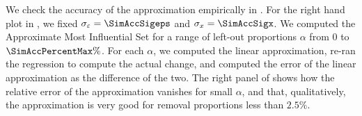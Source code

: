 We check the accuracy of the approximation empirically in
. For the right hand plot in ,
we fixed $\sigma_\varepsilon = \SimAccSigeps$ and $\sigma_x = \SimAccSigx$. We
computed the Approximate Most Influential Set for a range of left-out
proportions $\alpha$ from $0$ to $\SimAccPercentMax \%$.  For each $\alpha$, we
computed the linear approximation, re-ran the regression to compute the actual
change, and computed the error of the linear approximation as the difference of
the two.  The right panel of  shows how the relative
error of the approximation vanishes for small $\alpha$, and that, qualitatively,
the approximation is very good for removal proportions less than $2.5\%$.
